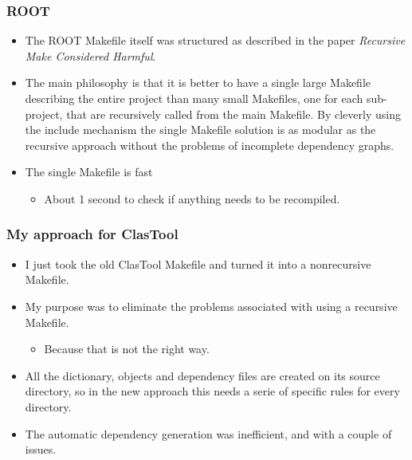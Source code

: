 \documentclass[11pt]{beamer}
\begin{document}

\begin{frame}
  \frametitle{ROOT}
  \begin{itemize}
    \item The ROOT Makefile itself was structured as described in the paper
      \emph{Recursive Make Considered Harmful}.\\[5mm]
    \item The main philosophy is that it is better to have a single large
      Makefile describing the entire project than many small Makefiles, one
      for each sub-project, that are recursively called from the main
      Makefile. By cleverly using the include mechanism the single Makefile
      solution is as modular as the recursive approach without the problems of
      incomplete dependency graphs.\\[5mm]
    \item The single Makefile is fast
      \begin{itemize}
        \item About 1 second to check if anything needs to be recompiled.
      \end{itemize}
  \end{itemize}
\end{frame}


\begin{frame}
  \frametitle{My approach for ClasTool}
  \begin{itemize}[<+->]
    \item I just took the old ClasTool Makefile and turned it into a
      nonrecursive Makefile.\\[4mm]
    \item My purpose was to eliminate the problems associated with using a
      recursive Makefile. 

      \begin{itemize}
        \item Because that is not the right way.\\[4mm]
      \end{itemize}

    \item All the dictionary, objects and dependency files are created on its
      source directory, so in the new approach this needs a serie of specific
      rules for every directory.\\[4mm]
    \item The automatic dependency generation was inefficient, and with a
      couple of issues. 
  \end{itemize}
\end{frame}
\end{document}
